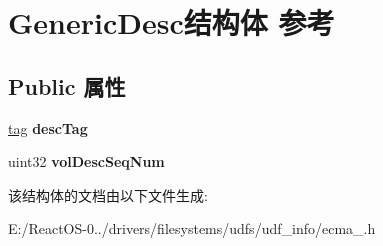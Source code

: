 \hypertarget{struct_generic_desc}{}\section{Generic\+Desc结构体 参考}
\label{struct_generic_desc}
\subsection*{Public 属性}
\begin{DoxyCompactItemize}
\item 
\mbox{\label{struct_generic_desc_a3328f8476c6f009faf4a0df4024ca4ee}} 
\hyperlink{structtag}{tag} {\bfseries desc\+Tag}
\item 
\mbox{\label{struct_generic_desc_a959ed18b8a80b436286e5ba078d64d6f}} 
uint32 {\bfseries vol\+Desc\+Seq\+Num}
\end{DoxyCompactItemize}


该结构体的文档由以下文件生成\+:\begin{DoxyCompactItemize}
\item 
E\+:/\+React\+O\+S-\/0../drivers/filesystems/udfs/udf\+\_\+info/ecma\+\_.\+h\end{DoxyCompactItemize}
